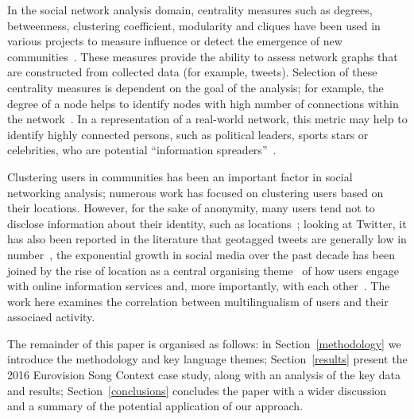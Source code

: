 \documentclass{llncs}
\begin{document}
In the social network analysis domain, centrality measures such as
degrees, betweenness, clustering coefficient, modularity and cliques
have been used in various projects to measure influence or detect the
emergence of new
communities~\cite{willis-et-al:2015,oatley+crick:2015}.  These
measures provide the ability to assess network graphs that are
constructed from collected data (for example, tweets). Selection of
these centrality measures is dependent on the goal of the analysis;
for example, the degree of a node helps to identify nodes with high
number of connections within the
network~\cite{borgatti+everett:2000,rombach-et-al:2014,liu-et-al:2014}.
In a representation of a real-world network, this metric may help to
identify highly connected persons, such as political leaders, sports
stars or celebrities, who are potential ``information
spreaders''~\cite{cha-et-al:2012,borge-holthoefer-et-al:2012,zhang-et-al:2016}.

Clustering users in communities has been an important factor in social
networking analysis; numerous work has focused on clustering users
based on their locations. However, for the sake of anonymity, many
users tend not to disclose information about their identity, such as
locations~\cite{kang-et-al:2013}; looking at Twitter, it has also been
reported in the literature that geotagged tweets are generally low in
number~\cite{morstatter-et-al:2013,tan-et-al:2013,kumar-et-al:2014},
the exponential growth in social media over the past decade has been
joined by the rise of location as a central organising
theme~\cite{liang-et-al:2013} of how users engage with online
information services and, more importantly, with each
other~\cite{cheng-et-al:2010,caverlee-et-al:2013}. The work here
examines the correlation between multilingualism of users and their
associaed activity.


The remainder of this paper is organised as follows: in
Section~\ref{methodology} we introduce the methodology and key
language themes; Section~\ref{results} present the 2016 Eurovision
Song Context case study, along with an analysis of the key data and
results; Section~\ref{conclusions} concludes the paper with a wider
discussion and a summary of the potential application of our approach.
\end{document}
